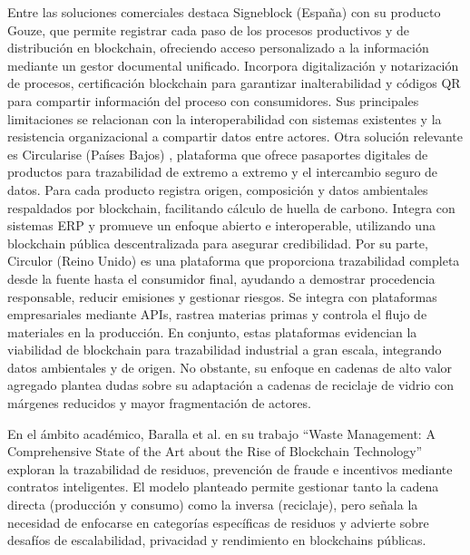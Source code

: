 Entre las soluciones comerciales destaca Signeblock (España) \cite{signeblock2024} con su producto Gouze, que permite registrar cada paso de los procesos productivos y de distribución en blockchain, ofreciendo acceso personalizado a la información mediante un gestor documental unificado. Incorpora digitalización y notarización de procesos, certificación blockchain para garantizar inalterabilidad y códigos QR para compartir información del proceso con consumidores. Sus principales limitaciones se relacionan con la interoperabilidad con sistemas existentes y la resistencia organizacional a compartir datos entre actores. Otra solución relevante es Circularise (Países Bajos) \cite{circularise2024}, plataforma que ofrece pasaportes digitales de productos para trazabilidad de extremo a extremo y el intercambio seguro de datos. Para cada producto registra origen, composición y datos ambientales respaldados por blockchain, facilitando cálculo de huella de carbono. Integra con sistemas ERP y promueve un enfoque abierto e interoperable, utilizando una blockchain pública descentralizada para asegurar credibilidad. Por su parte, Circulor (Reino Unido) \cite{circulor2024} es una plataforma que proporciona trazabilidad completa desde la fuente hasta el consumidor final, ayudando a demostrar procedencia responsable, reducir emisiones y gestionar riesgos. Se integra con plataformas empresariales mediante APIs, rastrea materias primas y controla el flujo de materiales en la producción. En conjunto, estas plataformas evidencian la viabilidad de blockchain para trazabilidad industrial a gran escala, integrando datos ambientales y de origen. No obstante, su enfoque en cadenas de alto valor agregado plantea dudas sobre su adaptación a cadenas de reciclaje de vidrio con márgenes reducidos y mayor fragmentación de actores.

En el ámbito académico, Baralla et al. en su trabajo ``Waste Management: A Comprehensive State of the Art about the Rise of Blockchain Technology'' \cite{baralla2023waste} exploran la trazabilidad de residuos, prevención de fraude e incentivos mediante contratos inteligentes. El modelo planteado permite gestionar tanto la cadena directa (producción y consumo) como la inversa (reciclaje), pero señala la necesidad de enfocarse en categorías específicas de residuos y advierte sobre desafíos de escalabilidad, privacidad y rendimiento en blockchains públicas. 

